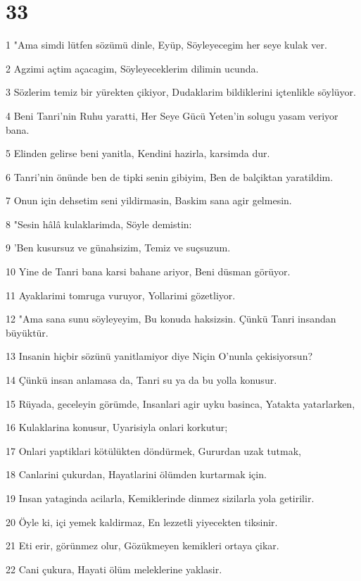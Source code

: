 \chapter{33}

\par 1 "Ama simdi lütfen sözümü dinle, Eyüp, Söyleyecegim her seye kulak ver.
\par 2 Agzimi açtim açacagim, Söyleyeceklerim dilimin ucunda.
\par 3 Sözlerim temiz bir yürekten çikiyor, Dudaklarim bildiklerini içtenlikle söylüyor.
\par 4 Beni Tanri'nin Ruhu yaratti, Her Seye Gücü Yeten'in solugu yasam veriyor bana.
\par 5 Elinden gelirse beni yanitla, Kendini hazirla, karsimda dur.
\par 6 Tanri'nin önünde ben de tipki senin gibiyim, Ben de balçiktan yaratildim.
\par 7 Onun için dehsetim seni yildirmasin, Baskim sana agir gelmesin.
\par 8 "Sesin hâlâ kulaklarimda, Söyle demistin:
\par 9 'Ben kusursuz ve günahsizim, Temiz ve suçsuzum.
\par 10 Yine de Tanri bana karsi bahane ariyor, Beni düsman görüyor.
\par 11 Ayaklarimi tomruga vuruyor, Yollarimi gözetliyor.
\par 12 "Ama sana sunu söyleyeyim, Bu konuda haksizsin. Çünkü Tanri insandan büyüktür.
\par 13 Insanin hiçbir sözünü yanitlamiyor diye Niçin O'nunla çekisiyorsun?
\par 14 Çünkü insan anlamasa da, Tanri su ya da bu yolla konusur.
\par 15 Rüyada, geceleyin görümde, Insanlari agir uyku basinca, Yatakta yatarlarken,
\par 16 Kulaklarina konusur, Uyarisiyla onlari korkutur;
\par 17 Onlari yaptiklari kötülükten döndürmek, Gururdan uzak tutmak,
\par 18 Canlarini çukurdan, Hayatlarini ölümden kurtarmak için.
\par 19 Insan yataginda acilarla, Kemiklerinde dinmez sizilarla yola getirilir.
\par 20 Öyle ki, içi yemek kaldirmaz, En lezzetli yiyecekten tiksinir.
\par 21 Eti erir, görünmez olur, Gözükmeyen kemikleri ortaya çikar.
\par 22 Cani çukura, Hayati ölüm meleklerine yaklasir.
